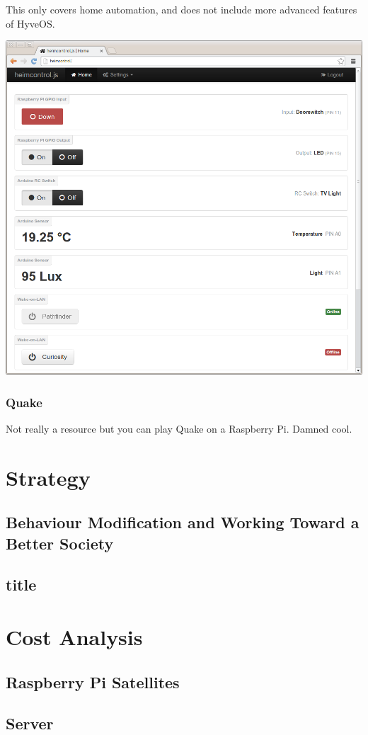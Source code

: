 \begin{multicols}{2}
			This only covers home automation, and does not include more advanced features of HyveOS.
			\begin{center}
				\includegraphics[width=.5\textwidth]{gfx/heimcontrol.png}
			\end{center}

		
		\subsubsection{Quake}
		
			Not really a resource but you can play Quake on a Raspberry Pi.
			Damned cool.
			
			
\section{Strategy}

	\subsection{Behaviour Modification and Working Toward a Better Society}
			
	\subsection{title}
			
\section{Cost Analysis}

	\subsection{Raspberry Pi Satellites}
	
	\subsection{Server}
	

\end{multicols}
